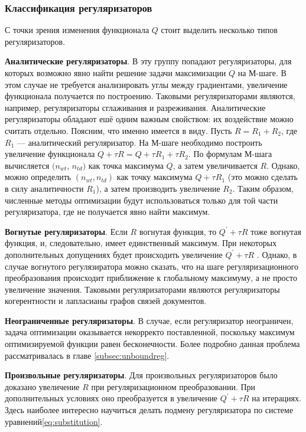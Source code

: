 \documentclass[12pt]{article}
\begin{document}
           \subsubsection{Классификация регуляризаторов}
С точки зрения изменения функционала $Q$ стоит выделить несколько типов регуляризаторов.

	 \textbf{Аналитические регуляризаторы}. В эту группу попадают регуляризаторы, для которых возможно явно найти решение  задачи  максимизации  $Q$ на М-шаге. В этом случае не требуется анализировать углы между градиентами, увеличение функционала получается по построению. Таковыми регуляризаторами являются, например, регуляризаторы сглаживания и разреживания. Аналитические регуляризаторы  обладают ешё одним важным свойством: их воздействие можно считать отдельно. Поясним, что именно имеется в виду. Пусть $R = R_1 + R_2$, где $R_1$ --- аналитический регуляризатор. На М-шаге необходимо построить увеличение функционала $Q + \tau R = Q + \tau R_1 + \tau R_2$. По формулам М-шага вычисляется $(n_{wt}$, $n_{td})$ как точка максимума $Q$, а затем увеличивается $R$.  Однако, можно определить $(n_{wt},n_{td})$ как точку максимума $Q + \tau R_1 $ (это можно сделать в силу аналитичности $R_1$), а затем производить увеличение $R_2$. Таким образом,  численные методы оптимизации будут использоваться только для той части регуляризатора, где не получается явно найти максимум.

	\textbf{Вогнутые регуляризаторы}. Если $R$ вогнутая функция, то $Q^{\prime} + \tau R$ тоже вогнутая функция, и, следовательно, имеет единственный максимум. При некоторых  дополнительных допущениях будет происходить увеличение $Q^{\prime} + \tau R$ . Однако, в случае вогнутого регулязиратора можно сказать, что на шаге регуляризационного преобразования происходит приближение к глобальному максимуму, а не просто увеличение значения. Таковыми регуляризаторами являются регуляризаторы когерентности и лапласианы графов связей документов.

	\textbf{Неограниченные регуляризаторы}. В случае, если регуляризатор неограничен, задача оптимизации оказывается некорректо поставленной, поскольку максимум оптимизируемой функции равен бесконечности. Более подробно данная проблема  рассматривалась в главе \ref{subsec:unboundreg}.

	\textbf{Произвольные регуляризаторы}. Для произвольных регуляризаторов было доказано увеличение $R$ при регуляризационном преобразовании. При дополнительных условиях оно преобразуется в увеличение $Q^{\prime} + \tau R$ на итерациях. Здесь наиболее интересно научиться делать подмену регуляризатора по системе уравнений\eqref{eq:substitution}.
\end{document}
